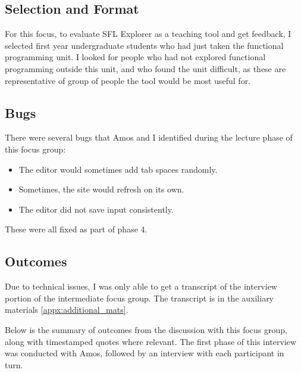 \subsection{Selection and Format}
For this focus, to evaluate SFL Explorer  as a teaching tool and get feedback, I selected first year undergraduate students who had just taken the functional programming unit. I looked for people who had not explored functional programming outside this unit, and who found the unit difficult, as these are representative of group of people the tool would be most useful for. 

\subsection{Bugs}
There were several bugs that Amos and I identified during the lecture phase of this focus group:
\begin{itemize}
    \item The editor would sometimes add tab spaces randomly.
    \item Sometimes, the site would refresh on its own.
    \item The editor did not save input consistently.
\end{itemize}
\noindent These were all fixed as part of phase 4.

\subsection{Outcomes}
Due to technical issues, I was only able to get a transcript of the interview portion of the intermediate focus group. 
The transcript is in the auxiliary materials \ref{appx:additional_mats}. 

Below is the summary of outcomes from the discussion with this focus group, along with timestamped quotes where relevant. The first phase of this interview was conducted with Amos, followed by an interview with each participant in turn. 

